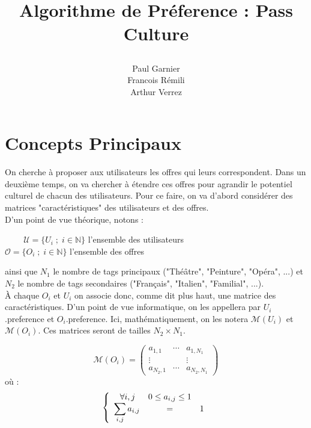 \documentclass[11pt, oneside]{article}
\title{\begin{center} Algorithme de Préference : Pass Culture \end{center}}
\author{Paul Garnier \\ Francois Rémili \\ Arthur Verrez}
\begin{document}
\maketitle


\pagestyle{empty} 

\maketitle





\pagestyle{plain}

\section{Concepts Principaux}

On cherche à proposer aux utilisateurs les offres qui leurs correspondent. Dans un deuxième temps, on va chercher à étendre ces offres pour agrandir le potentiel culturel de chacun des utilisateurs. Pour ce faire, on va d'abord considérer des matrices "caractéristiques" des utilisateurs et des offres. \\

D'un point de vue théorique, notons :

\begin{center}

 $\;\;\;\;\;\;\;\;\mathcal{U} = \{U_i \; ; \; i \in \mathbb{N} \}$ l'ensemble des utilisateurs \\
$\mathcal{O} = \{O_i \; ; \; i \in \mathbb{N} \}$ l'ensemble des offres \\

\end{center}

ainsi que $N_1$ le nombre de tags principaux ("Théâtre", "Peinture", "Opéra", ...) et $N_2$ le nombre de tags secondaires ("Français", "Italien", "Familial", ...). \\

À chaque $O_i$ et $U_i$ on associe donc, comme dit plus haut, une matrice des caractéristiques. D'un point de vue informatique, on les appellera par $U_i$.preference et $O_i$.preference. Ici, mathématiquement, on les notera $\mathcal{M} (U_i)$ et $\mathcal{M} (O_i)$. Ces matrices seront de tailles $N_2 \times N_1$. 

\begin{center}
\[
\mathcal{M} (O_i) = 
\begin{pmatrix}
a_{1,1} & \cdots & a_{1,N_1} \\
\vdots & & \vdots \\
a_{N_2,1} & \cdots & a_{N_2,N_1} 
\end{pmatrix}
\]
où :
\[
 \left \{
   \begin{array}{r c l}
      \forall i,j \; \; & 0 \leq a_{i,j} \leq 1 \\
      \displaystyle \sum_{i,j} a_{i,j} &=& 1 \\ 
   \end{array}
   \right .
\]   
\end{center}
\end{document}
